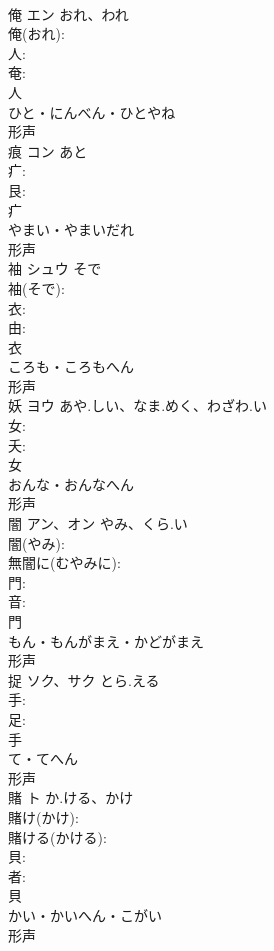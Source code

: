 \documentclass[8pt]{extreport}
\begin{document}
\begin{CJK}{UTF8}{min}
\\	俺	エン	おれ、われ		
\\	俺(おれ): 
\\	人: 
\\	奄: 
\\	人	
\\	ひと・にんべん・ひとやね	
\\	形声 
\\	痕	コン	あと		
\\	疒: 
\\	艮: 
\\	疒	
\\	やまい・やまいだれ	
\\	形声 
\\	袖	シュウ	そで		
\\	袖(そで): 
\\	衣: 
\\	由: 
\\	衣	
\\	ころも・ころもへん	
\\	形声 
\\	妖	ヨウ	あや.しい、なま.めく、わざわ.い		
\\	女: 
\\	夭: 
\\	女	
\\	おんな・おんなへん	
\\	形声 
\\	闇	アン、オン	やみ、くら.い		
\\	闇(やみ): 
\\	無闇に(むやみに): 
\\	門: 
\\	音: 
\\	門	
\\	もん・もんがまえ・かどがまえ	
\\	形声 
\\	捉	ソク、サク	とら.える		
\\	手: 
\\	足: 
\\	手	
\\	て・てへん	
\\	形声 
\\	賭	ト	か.ける、かけ		
\\	賭け(かけ): 
\\	賭ける(かける): 
\\	貝: 
\\	者: 
\\	貝	
\\	かい・かいへん・こがい	
\\	形声 

\end{CJK}
\end{document}
